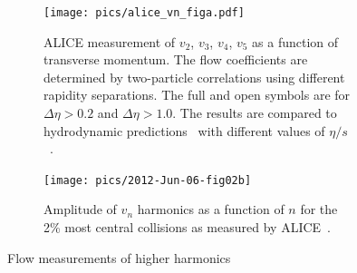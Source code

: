 \begin{figure}[tb]
	\centering
	\begin{subfigure}[t]{0.5\textwidth}
                \texttt{[image: pics/alice\_vn\_figa.pdf]}
        \caption[ALICE measurement of $v_2$, $v_3$, $v_4$, $v_5$]{ALICE measurement of $v_2$, $v_3$, $v_4$, $v_5$ as a function of transverse momentum. The flow coefficients are determined by two-particle correlations using different rapidity separations. 
        The full and open symbols are for $\Delta\eta > 0.2$ and $\Delta\eta > 1.0$. 
        The results are compared to hydrodynamic predictions~\cite{Schenke:2011tv} with different values of $\eta/s$~\cite{PRL107032301}.}
        \label{fig:higherharmonics}
        \end{subfigure}
        \quad
        \begin{subfigure}[t]{0.45\textwidth}
        \texttt{[image: pics/2012-Jun-06-fig02b]}
        \caption{Amplitude of $v_n$ harmonics as a function of $n$ for the 2\% most central collisions as  measured by ALICE~\cite{Aamodt2012249}.}
        \label{fig:alicepowers}

        \end{subfigure} 
        
                \caption[Flow measurements of higher harmonics]{Flow measurements of higher harmonics}
                \label{fig:vnpowers}

\end{figure}









